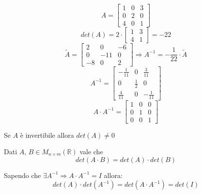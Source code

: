 \begin{example}
	\begin{equation*}
		A = \begin{bmatrix}
			1 & 0 & 3 \\
			0 & 2 & 0 \\
			4 & 0 & 1
		\end{bmatrix}
	\end{equation*}
	\begin{equation*}
		det(A) = 2 \cdot \begin{bmatrix}
			1 & 3 \\
			4 & 1
		\end{bmatrix} = -22
	\end{equation*}
	\begin{equation*}
		\tilde{A} = \begin{bmatrix}
			2 & 0 & -6 \\
			0 & -11 & 0 \\ 
			-8 & 0 & 2
		\end{bmatrix} \Longrightarrow A^{-1} = -\frac{1}{22} \cdot \tilde{A}
	\end{equation*}
	\begin{equation}
		A^{-1} = \begin{bmatrix}
			-\frac{1}{11} & 0 & \frac{3}{11} \\
			0 & \frac{1}{2} & 0 \\
			\frac{4}{11} & 0 & -\frac{1}{11}
		\end{bmatrix}
	\end{equation}
	\begin{equation*}
		A \cdot A^{-1} = \begin{bmatrix}
			1 & 0 & 0 \\
			0 & 1 & 0 \\
			0 & 0 & 1
		\end{bmatrix}
	\end{equation*}
\end{example}

\begin{proposition}
	Se $A$ è invertibile allora $det(A) \neq 0$
\end{proposition}

\begin{theorem}
	Dati $A$, $B \in M_{n \times m}(\mathbb{R})$ vale che
	\begin{equation*}
		det(A \cdot B) = det(A) \cdot det(B)
	\end{equation*}
\end{theorem}
\begin{proposition}
	Sapendo che $\exists A^{-1} \Longrightarrow A \cdot A^{-1} = I$ allora:
	\begin{equation*}
		det(A) \cdot det(A^{-1}) = det(A \cdot A^{-1}) = det(I)
	\end{equation*}
\end{proposition}

